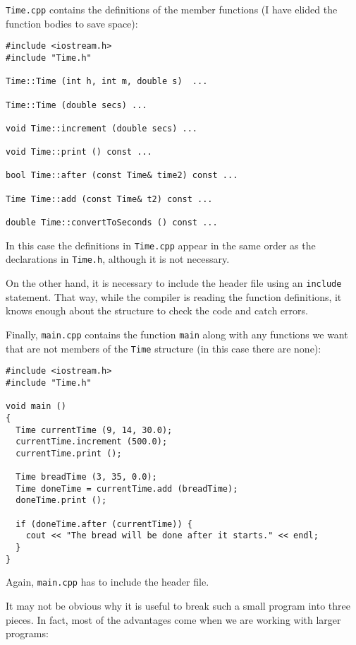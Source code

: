 {\tt Time.cpp} contains the definitions of the member functions
(I have elided the function bodies to save space):

\begin{verbatim}
#include <iostream.h>
#include "Time.h"

Time::Time (int h, int m, double s)  ...

Time::Time (double secs) ...

void Time::increment (double secs) ...

void Time::print () const ...

bool Time::after (const Time& time2) const ...

Time Time::add (const Time& t2) const ...

double Time::convertToSeconds () const ...
\end{verbatim}
%
In this case the definitions in {\tt Time.cpp} appear in the
same order as the declarations in {\tt Time.h}, although it
is not necessary.

On the other hand, it is necessary to include the header
file using an {\tt include} statement.  That way, while the
compiler is reading the function definitions, it knows enough
about the structure to check the code and catch errors.

Finally, {\tt main.cpp} contains the function {\tt main} along
with any functions we want that are not members of the {\tt Time}
structure (in this case there are none):

\begin{verbatim}
#include <iostream.h>
#include "Time.h"

void main ()
{
  Time currentTime (9, 14, 30.0);
  currentTime.increment (500.0);
  currentTime.print ();

  Time breadTime (3, 35, 0.0);
  Time doneTime = currentTime.add (breadTime);
  doneTime.print ();

  if (doneTime.after (currentTime)) {
    cout << "The bread will be done after it starts." << endl;
  }
}

\end{verbatim}
%
Again, {\tt main.cpp} has to include the header file.

It may not be obvious why it is useful to break such a small
program into three pieces.  In fact, most of the advantages come
when we are working with larger programs:

